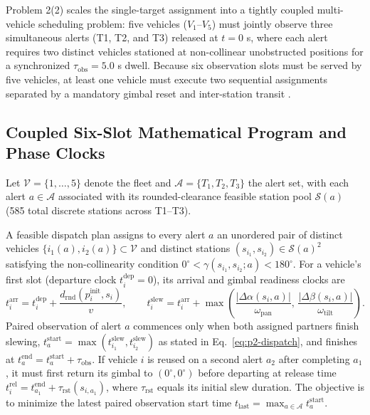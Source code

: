 Problem 2(2) scales the single-target assignment into a tightly coupled multi-vehicle scheduling problem: five vehicles ($V_1$--$V_5$) must jointly observe three simultaneous alerts (T1, T2, and T3) released at $t=0$ s, where each alert requires two distinct vehicles stationed at non-collinear unobstructed positions for a synchronized $\tau_{\mathrm{obs}}=5.0$ s dwell. Because six observation slots must be served by five vehicles, at least one vehicle must execute two sequential assignments separated by a mandatory gimbal reset and inter-station transit \cite{psaraftis1980,savelsbergh1995}.

\subsection{Coupled Six-Slot Mathematical Program and Phase Clocks}
Let $\mathcal{V}=\{1,\dots,5\}$ denote the fleet and $\mathcal{A}=\{T_1,T_2,T_3\}$ the alert set, with each alert $a\in\mathcal{A}$ associated with its rounded-clearance feasible station pool $\mathcal{S}(a)$ (585 total discrete stations across T1--T3).

A feasible dispatch plan assigns to every alert $a$ an unordered pair of distinct vehicles $\{i_1(a), i_2(a)\}\subset\mathcal{V}$ and distinct stations $(s_{i_1},s_{i_2})\in\mathcal{S}(a)^2$ satisfying the non-collinearity condition $0^\circ < \gamma(s_{i_1},s_{i_2};a) < 180^\circ$. For a vehicle's first slot (departure clock $t_i^{\mathrm{dep}}=0$), its arrival and gimbal readiness clocks are
\[
t_i^{\mathrm{arr}} = t_i^{\mathrm{dep}} + \frac{d_{\mathrm{rnd}}(p_i^{\mathrm{init}}, s_i)}{v}, \qquad
t_i^{\mathrm{slew}} = t_i^{\mathrm{arr}} + \max\!\left(\frac{|\Delta\alpha(s_i,a)|}{\omega_{\mathrm{pan}}},\,\frac{|\Delta\beta(s_i,a)|}{\omega_{\mathrm{tilt}}}\right).
\]
Paired observation of alert $a$ commences only when both assigned partners finish slewing, $t_a^{\mathrm{start}}=\max(t_{i_1}^{\mathrm{slew}},t_{i_2}^{\mathrm{slew}})$ as stated in Eq.~\eqref{eq:p2-dispatch}, and finishes at $t_a^{\mathrm{end}}=t_a^{\mathrm{start}}+\tau_{\mathrm{obs}}$. If vehicle $i$ is reused on a second alert $a_2$ after completing $a_1$, it must first return its gimbal to $(0^\circ,0^\circ)$ before departing at release time $t_i^{\mathrm{rel}} = t_{a_1}^{\mathrm{end}} + \tau_{\mathrm{rst}}(s_{i,a_1})$, where $\tau_{\mathrm{rst}}$ equals its initial slew duration. The objective is to minimize the latest paired observation start time $t_{\mathrm{last}}=\max_{a\in\mathcal{A}} t_a^{\mathrm{start}}$.

